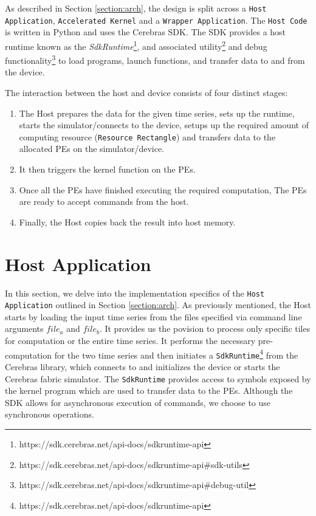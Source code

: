 As described in Section \ref{section:arch}, the design is split across a \texttt{Host Application}, \texttt{Accelerated Kernel} and a \texttt{Wrapper Application}. The \texttt{Host Code} is written in Python and uses the Cerebras SDK. The SDK provides a host runtime known as the \textit{SdkRuntime}\footnote{https://sdk.cerebras.net/api-docs/sdkruntime-api}, and associated utility\footnote{https://sdk.cerebras.net/api-docs/sdkruntime-api\#sdk-utils} and debug functionality\footnote{https://sdk.cerebras.net/api-docs/sdkruntime-api\#debug-util} to load programs, launch functions, and transfer data to and from the device.

The interaction between the host and device consists of four distinct stages:

\begin{enumerate}
    \item The Host prepares the data for the given time series, sets up the runtime, starts the simulator/connects to the device, setups up the required amount of computing resource (\texttt{Resource Rectangle}) and transfers data to the allocated PEs on the simulator/device.
    \item It then triggers the kernel function on the PEs.
    \item Once all the PEs have finished executing the required computation, The PEs are ready to accept commands from the host.
    \item Finally, the Host copies back the result into host memory.
\end{enumerate}

\section{Host Application} \label{section:host_application}

In this section, we delve into the implementation specifics of the \texttt{Host Application} outlined in Section \ref{section:arch}. As previously mentioned, the Host starts by loading the input time series from the files specified via command line arguments $file_a$ and $file_b$. It provides us the povision to process only specific tiles for computation or the entire time series. It performs the necessary pre-computation for the two time series and then initiates a \texttt{SdkRuntime}\footnote{https://sdk.cerebras.net/api-docs/sdkruntime-api} from the Cerebras library, which connects to and initializes the device or starts the Cerebras fabric simulator. The \texttt{SdkRuntime} provides access to symbols exposed by the kernel program which are used to transfer data to the PEs. Although the SDK allows for asynchronous execution of commands, we choose to use synchronous operations.

